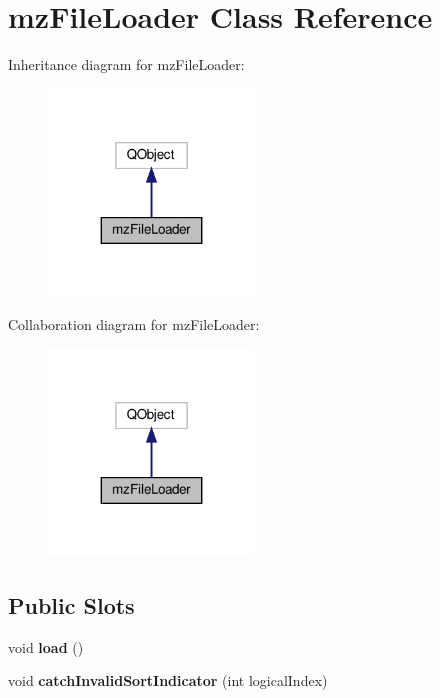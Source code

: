 \hypertarget{classmz_file_loader}{}\section{mz\+File\+Loader Class Reference}
\label{classmz_file_loader}


Inheritance diagram for mz\+File\+Loader\+:\nopagebreak
\begin{figure}[H]
\begin{center}
\leavevmode
\includegraphics[width=155pt]{classmz_file_loader__inherit__graph}
\end{center}
\end{figure}


Collaboration diagram for mz\+File\+Loader\+:\nopagebreak
\begin{figure}[H]
\begin{center}
\leavevmode
\includegraphics[width=155pt]{classmz_file_loader__coll__graph}
\end{center}
\end{figure}
\subsection*{Public Slots}
\begin{DoxyCompactItemize}
\item 
\mbox{\label{classmz_file_loader_acddd84704393e54d2e3c48e999a55b15}} 
void {\bfseries load} ()
\item 
\mbox{\label{classmz_file_loader_aefa32f6cd9d1814b5d140e13a066a234}} 
void {\bfseries catch\+Invalid\+Sort\+Indicator} (int logical\+Index)
\end{DoxyCompactItemize}
